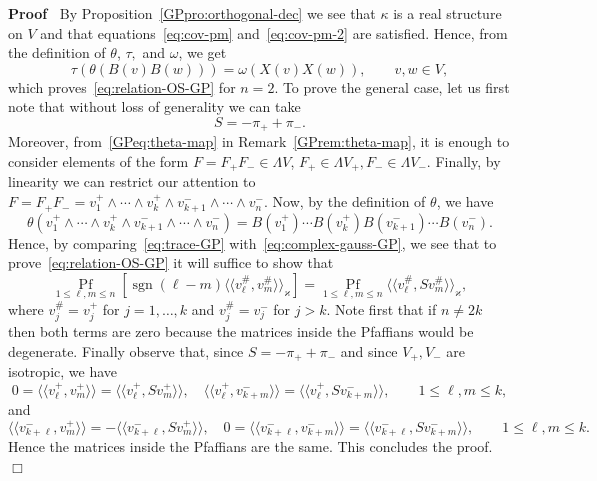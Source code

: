 \documentclass{article}
\newcommand{\llangle}{{\langle\!\langle}}
\newcommand{\rrangle}{{\rangle\!\rangle}}
\newcommand{\tmop}[1]{\ensuremath{\operatorname{#1}}}
\newenvironment{proof}{\noindent\textbf{Proof\ }}{\hspace*{\fill}$\Box$\medskip}
\begin{document}
\begin{proof}
  By Proposition~\ref{GPpro:orthogonal-dec} we see that $\kappa$ is a real
  structure on $V$ and that equations~{\eqref{eq:cov-pm}}
  and~{\eqref{eq:cov-pm-2}} are satisfied. Hence, from the definition of
  $\theta$, $\tau,$ and $\omega$, we get
  \[ \tau (\theta (B (v) B (w))) = \omega (X (v) X (w)), \qquad v, w \in V, \]
  which proves~{\eqref{eq:relation-OS-GP}} for $n = 2$. To prove the general
  case, let us first note that without loss of generality we can take
  \[ S = - \pi_+ + \pi_- . \]
  Moreover, from~{\eqref{GPeq:theta-map}} in Remark~\ref{GPrem:theta-map}, it
  is enough to consider elements of the form $F = F_+ F_- \in \Lambda V$, $F_+
  \in \Lambda V_+, F_- \in \Lambda V_-$. Finally, by linearity we can restrict
  our attention to $F = F_+ F_- = v_1^+ \wedge \cdots \wedge v_k^+ \wedge v_{k
  + 1}^- \wedge \cdots \wedge v_n^-$. Now, by the definition of $\theta$, we
  have
  \[ \theta (v_1^+ \wedge \cdots \wedge v_k^+ \wedge v_{k + 1}^- \wedge \cdots
     \wedge v_n^-) = B (v_1^+) \cdots B (v_k^+) B (v^-_{k + 1}) \cdots B
     (v_n^-) . \]
  Hence, by comparing~{\eqref{eq:trace-GP}}
  with~{\eqref{eq:complex-gauss-GP}}, we see that to
  prove~{\eqref{eq:relation-OS-GP}} it will suffice to show that
  \[ \underset{1 \leqslant \ell, m \leqslant n}{\tmop{Pf}} [\tmop{sgn} (\ell
     - m) \llangle v^{\#}_{\ell}, v^{\#}_m \rrangle_{\varkappa}] = \underset{1
     \leqslant \ell, m \leqslant n}{\tmop{Pf}} \llangle v^{\#}_{\ell}, S
     v^{\#}_m \rrangle_{\varkappa}, \]
  where $v_j^{\#} = v_j^+$ for $j = 1, \ldots, k$ and $v^{\#}_j = v_j^-$ for
  $j > k$. Note first that if $n \neq 2 k$ then both terms are zero because
  the matrices inside the Pfaffians would be degenerate. Finally observe that,
  since $S = - \pi_+ + \pi_-$ and since $V_+, V_-$ are isotropic, we have
  \[ 0 = \llangle v^+_{\ell}, v^+_m \rrangle = \llangle v^+_{\ell}, S v^+_m
     \rrangle, \quad \llangle v^+_{\ell}, v^-_{k + m} \rrangle = \llangle
     v^+_{\ell}, S v^-_{k + m} \rrangle, \qquad 1 \leqslant \ell, m \leqslant
     k, \]
  and
  \[ \llangle v^-_{k + \ell}, v^+_m \rrangle = - \llangle v^-_{k + \ell}, S
     v^+_m \rrangle, \quad 0 = \llangle v^-_{k + \ell}, v^-_{k + m} \rrangle =
     \llangle v^-_{k + \ell}, S v^-_{k + m} \rrangle, \qquad 1 \leqslant \ell,
     m \leqslant k. \]
  Hence the matrices inside the Pfaffians are the same. This concludes the
  proof.
\end{proof}
\end{document}
